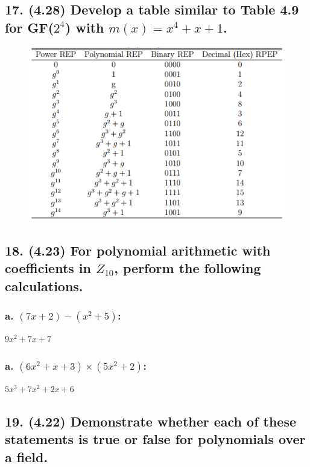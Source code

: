 \documentclass[fleqn, 12pt]{article}
\begin{document}
\subsection*{17. (4.28) Develop a table similar to Table 4.9 for GF($2^4$) with
$m(x) = x^4 + x + 1$.}
    \begin{figure}[h]
      \centering
      \includegraphics{quatro_vinte_e_oito}
    \end{figure}

\subsection*{18. (4.23) For polynomial arithmetic with coefficients in $Z_{10}$,
perform the following calculations.}

  \subsubsection*{a. $(7x + 2) - (x^2 + 5)$:}

    $9x^2 + 7x + 7$

  \subsubsection*{a. $(6x^2 + x + 3) \times (5x^2 + 2)$:}

    $5x^3 + 7x^2 + 2x + 6$

\subsection*{19. (4.22) Demonstrate whether each of these statements is true or
false for polynomials over a field.}
\end{document}
